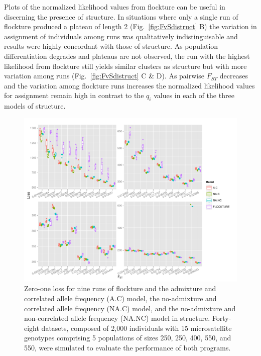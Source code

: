 Plots of the normalized likelihood values from {\sc flockture} can be useful in discerning the presence of 
structure.  In situations where only a single run of {\sc flockture} produced a plateau of length 2 
(Fig.~\ref{fig:FvSdistruct} B) the variation in assignment of individuals among runs was qualitatively indistinguisable
and results were highly concordant with those of {\sc structure}. As population differentiation degrades 
and plateaus are not observed, the run with the highest likelihood from {\sc flockture} still yields
similar clusters as {\sc structure} but with more variation among runs (Fig.~\ref{fig:FvSdistruct} C \& D).
As pairwise $F_{ST}$ decreases and the variation among {\sc flockture} runs increases the normalized likelihood
values for assignment remain high in contrast to the $q_i$ values in each of the three models of {\sc structure}. 

  \begin{figure}
\centering
\includegraphics[width=.9\linewidth]{images/Figures-Pat/uSatLoss.pdf}%
  \caption{Zero-one loss for nine runs of {\sc flockture} and the admixture and correlated allele 
  frequency (A.C) model, the no-admixture and correlated allele frequency (NA.C) model, 
and the no-admixture and non-correlated allele frequency (NA.NC) model in {\sc structure}. Forty-eight 
datasets, composed of 2,000 individuals with 15 microsatellite genotypes comprising
5 populations of sizes 250, 250, 400, 550, and 550, were simulated to evaluate the performance
of both programs. }
  \label{fig:uSatLoss}
\end{figure} 

